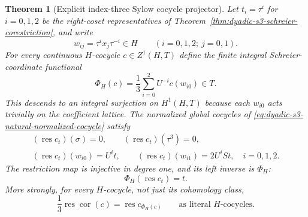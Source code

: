 \documentclass[11pt]{article}
\newtheorem{theorem}{Theorem}[section]
\theoremstyle{definition}
\begin{document}
\begin{theorem}[Explicit index-three Sylow cocycle projector]
\label{thm:dyadic-s3-explicit-cocycle-projector}
Let
$t_i=\tau^i$ for $i=0,1,2$
be the right-coset representatives
of Theorem~\ref{thm:dyadic-s3-schreier-corestriction},
and write
\[
w_{ij}=\tau^i x_j\tau^{-i}\in H
\qquad(i=0,1,2;\ j=0,1).
\]
For \emph{every} continuous
$H$-cocycle $c\in Z^1(H,T)$
define the finite integral
Schreier-coordinate functional
\begin{equation}\label{eq:dyadic-s3-strict-phi-functional}
\boxed{\quad
\Phi_H(c)=\frac13
\sum_{i=0}^{2}U^{-i}c(w_{i0})\in T.
\quad}
\end{equation}
This descends to an
integral surjection on
$H^1(H,T)$ because each
$w_{i0}$ acts trivially
on the coefficient lattice.
The normalized global cocycles
of \eqref{eq:dyadic-s3-natural-normalized-cocycle}
satisfy
\begin{equation}\label{eq:dyadic-s3-strict-res-values}
\boxed{\quad
\begin{gathered}
(\operatorname{res}c_t)(\sigma)=0,\qquad
(\operatorname{res}c_t)(\tau^3)=0,\\
(\operatorname{res}c_t)(w_{i0})=U^i t,
\qquad
(\operatorname{res}c_t)(w_{i1})=2U^iS t,
\quad i=0,1,2.
\end{gathered}\quad}
\end{equation}
The restriction map is
injective in degree one,
and its left inverse is
$\Phi_H$:
\begin{equation}\label{eq:dyadic-s3-strict-res-phi}
\Phi_H(\operatorname{res}c_t)=t.
\end{equation}
More strongly, for every
$H$-\emph{cocycle}, not just
its cohomology class,
\begin{equation}\label{eq:dyadic-s3-strict-e-cocycle}
\boxed{\quad
\frac13\operatorname{res}
\operatorname{cor}(c)
=\operatorname{res}c_{\Phi_H(c)}
\qquad\text{as literal }H
\text{-cocycles}.\quad}
\end{equation}


\end{theorem}
\end{document}
